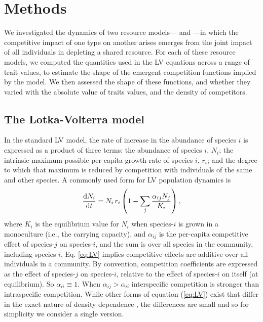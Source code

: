 \documentclass[a4paper,11pt]{article}
\begin{document}
\section{Methods}

We investigated the dynamics of two resource models--- \Rstar{} and \plant{}---in which the competitive impact of one type on another arises emerges from the joint impact of all individuals in depleting a shared resource. For each of these resource models, we computed the quantities used in the LV equations across a range of trait values, to estimate the shape of the emergent competition functions implied by the model. We then assessed the shape of these functions, and whether they varied with the absolute value of traits values, and the density of competitors.

\subsection{The Lotka-Volterra model}

In the standard LV model, the rate of increase in the abundance of species $i$ is expressed as a product of three terms: the abundance of species $i$, $N_i$; the intrinsic maximum possible per-capita growth rate of species $i$, $r_i$; and the degree to which that maximum is reduced by competition with individuals of the same and other species. A commonly used form for LV population dynamics is 
\begin{equation} \label{eq:LV} 
	\frac{\mathrm{d} N_i}{\mathrm{d} t} = N_i\, r_i \left(1 - \sum_j \frac{\alpha_{ij} N_j}{K_i}\right), 
\end{equation}
where $K_i$ is the equilibrium value for $N_i$ when species-$i$ is grown in a monoculture (i.e., the carrying capacity), and $\alpha_{ij}$ is the per-capita competitive effect of species-$j$ on species-$i$, and the sum is over all species in the community, including species $i$. Eq. \ref{eq:LV} implies competitive effects are additive over all individuals in a community. By convention, competition coefficients are expressed as the effect of species-$j$ on species-$i$, relative to the effect of species-$i$ on itself (at equilibrium).  So $\alpha_{ii} \equiv 1$. When $\alpha_{ij} > \alpha_{ii}$ interspecific competition is stronger than intraspecific competition. While other forms of equation (\ref{eq:LV}) exist that differ in the exact nature of density dependence \citep[e.g.][]{Leimar-2013}, the differences are small and so for simplicity we consider a single version.
\end{document}
